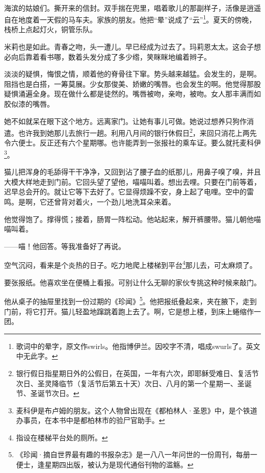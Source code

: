 \par 海滨的姑娘们。撕开来的信封。双手揣在兜里，唱着歌儿的那副样子，活像是逍遥自在地度着一天假的马车夫。家族的朋友。他把“晕”说成了“云”\footnote{歌词中的晕字，原文作swirls。他指博伊兰。因咬字不清，唱成swurls了。英文中无此字。}。夏天的傍晚，栈桥上点起灯火，铜管乐队。
\par 米莉也是如此。青春之吻，头一遭儿。早已经成为过去了。玛莉恩太太。这会子想必向后靠着看书哪，数着头发分成了多少绺，笑眯眯地编着辫子。
\par 淡淡的疑惧，悔恨之情，顺着他的脊骨往下窜。势头越来越猛。会发生的，是啊。阻挡也是白搭，一筹莫展。少女那俊美、娇嫩的嘴唇。也会发生的啊。他觉得那股疑惧涌遍全身。现在做什么都是徒然的。嘴唇被吻，亲吻，被吻。女人那丰满而如胶似漆的嘴唇。
\par 她不如就呆在眼下这个地方。远离家门。让她有事儿可做。她说过想养只狗作消遣。也许我到她那儿去旅行一趟。利用八月间的银行休假日\footnote{银行假日指星期日外的公假日，在英国，一年有六次，即耶稣受难日、复活节次日、圣灵降临节（复活节后第五十天）次日、八月的第一个星期一、圣诞节、圣诞节次日。}，来回只消花上两先令六便士。反正还有六个星期哪。也许能弄到一张报社的乘车证。要么就托麦科伊\footnote{麦科伊是布卢姆的朋友。这个人物曾出现在《都柏林人·圣恩》中，是个铁道办事员，在本书中是都柏林市的验尸官助手。}。
\par 猫儿把浑身的毛舔得干干净净，又回到沾了腰子血的纸那儿，用鼻子嗅了嗅，并且大模大样地走到门前。它回头望了望他，喵喵叫着。想出去哩。只要在门前等着，迟早总会开的。就让它等下去好了。它显得烦躁不安，身上起了电哩。空中的雷鸣。是啊，它还曾背对着火，一个劲儿地洗耳朵来着。
\par 他觉得饱了。撑得慌；接着，肠胃一阵松动。他站起来，解开裤腰带。猫儿朝他喵喵叫着。
\par ——喵！他回答。等我准备好了再说。
\par 空气沉闷，看来是个炎热的日子。吃力地爬上楼梯到平台\footnote{指设在楼梯平台处的厕所。}那儿去，可太麻烦了。
\par 要张报纸。他喜欢坐在便桶上看报。可别让什么无聊的家伙专挑这种时候来敲门。
\par 他从桌子的抽屉里找到一份过期的《珍闻》\footnote{《珍闻·摘自世界最有趣的书报杂志》是一八八一年问世的一份周刊，每册一便士，逢星期四出版，被认为是现代通俗刊物的滥觞。}。他把报纸叠起来，夹在腋下，走到门前，将它打开。猫儿轻盈地蹿跳着跑上去了。啊，它是想上楼，到床上蜷缩作一团。
